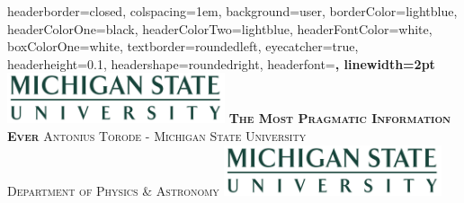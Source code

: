 \documentclass[landscape,a0paper,fontscale=0.28]{baposter} %
\begin{document}
\begin{poster}
{
headerborder=closed, %
colspacing=1em, %
background=user,
borderColor=lightblue, %
headerColorOne=black, %
headerColorTwo=lightblue, %
headerFontColor=white, %
boxColorOne=white, %
textborder=roundedleft, %
eyecatcher=true, %
headerheight=0.1\textheight, %
headershape=roundedright, %
headerfont=\Large\bf\textsc, %
linewidth=2pt %
}
%
{\includegraphics[height=4em]{MSU.jpg}} %
{\bf\textsc{The Most Pragmatic Information Ever}\vspace{0.5em}} %
{\textsc{Antonius Torode -  \hspace{12pt} Michigan State University \\ Department of Physics \& Astronomy}} %
{\includegraphics[height=4em]{MSU.jpg}} %



\end{poster}
\end{document}
